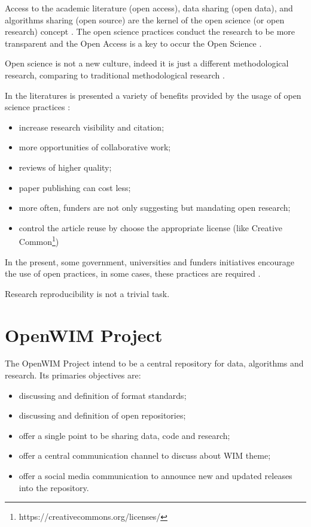 \documentclass[a4paper]{article}
\begin{document}
{Access to the academic literature (open access), data sharing (open data), and algorithms sharing (open source) are the kernel of the open science (or open research) concept \cite{article:the-open-research-value-proposition}. The open science practices conduct the research to be more transparent \cite{dorch2015open} and the Open Access is a key to occur the Open Science \cite{margoni2016open}.

Open science is not a new culture, indeed it is just a different methodological research, comparing to traditional methodological research \cite{assante2015science}.

In the literatures is presented a variety of benefits provided by the usage of open science practices \cite{article:the-open-research-value-proposition}:

\begin{itemize}
\item increase research visibility and citation;
\item more opportunities of collaborative work;
\item reviews of higher quality;
\item paper publishing can cost less;
\item more often, funders are not only suggesting but mandating open research;
\item control the article reuse by choose the appropriate license (like Creative Common\footnote{https://creativecommons.org/licenses/})
\end{itemize}

In the present, some government, universities and funders initiatives encourage the use of open practices, in some cases, these practices are required \cite{article:the-open-research-value-proposition}.

Research reproducibility is not a trivial task. \cite{open2015estimating}	

\section{OpenWIM Project}\label{open-wim}

The OpenWIM Project intend to be a central repository for data, algorithms and research. Its primaries objectives are:

\begin{itemize}
\item discussing and definition of format standards;
\item discussing and definition of open repositories;
\item offer a single point to be sharing data, code and research;
\item offer a central communication channel to discuss about WIM theme;
\item offer a social media communication to announce new and updated releases into the repository.
\end{itemize}

}
\end{document}
